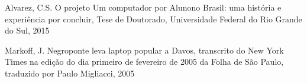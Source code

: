 \documentclass[
12pt,		%
openright,	%
twoside,  %
a4paper,			%
chapter=TITLE,		%
english,			%
french,				%
spanish,			%
brazil				%
]{USPSC-classe/USPSC}
\begin{document}
\begin{flushleft}
\begin{flushleft}
\begin{flushleft}
\begin{flushleft}
\begin{flushleft}
\begin{flushleft}
\begin{flushleft}
\begin{flushleft}
[ALVAREZ, 2015] Alvarez, C.S. O projeto \textquotedbl Um computador por Aluno\textquotedbl  no Brasil: uma hist\'oria e experi\^encia por concluir, Tese de Doutorado, Universidade Federal do Rio Grande do Sul, 2015
\end{flushleft}


\end{flushleft}


\end{flushleft}


\end{flushleft}


\end{flushleft}


\end{flushleft}


\end{flushleft}


\end{flushleft}


\begin{flushleft}
\begin{flushleft}
\begin{flushleft}
\begin{flushleft}
\begin{flushleft}
\begin{flushleft}
\begin{flushleft}
\begin{flushleft}
[MARKOFF, 2005] Markoff, J. Negroponte leva laptop popular a Davos, transcrito do New York Times na edi\c{c}\~ao do dia primeiro de fevereiro de 2005 da Folha de S\~ao Paulo, traduzido por Paulo Migliacci, 2005
\end{flushleft}


\end{flushleft}


\end{flushleft}


\end{flushleft}


\end{flushleft}


\end{flushleft}


\end{flushleft}


\end{flushleft}
\end{document}
